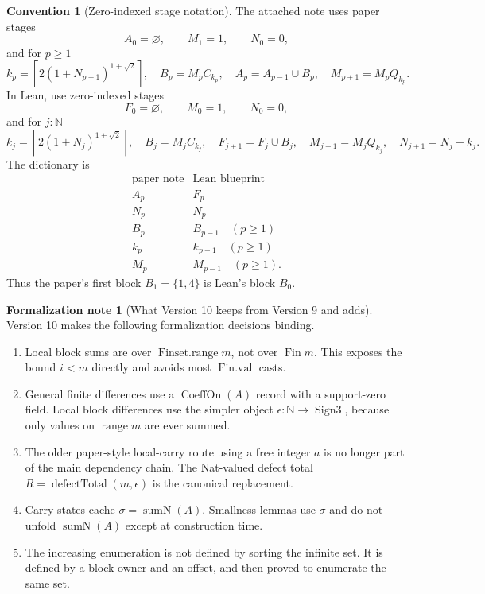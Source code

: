 \documentclass[11pt]{article}
\theoremstyle{definition}
\newtheorem{convention}[definition]{Convention}
\newtheorem{formalnote}[definition]{Formalization note}
\theoremstyle{plain}
\theoremstyle{remark}
\newcommand{\N}{\mathbb{N}}
\newcommand{\SumN}{\operatorname{sumN}}
\newcommand{\CoeffOn}{\operatorname{CoeffOn}}
\newcommand{\DTotal}{\operatorname{defectTotal}}
\begin{document}
\begin{convention}[Zero-indexed stage notation]
The attached note uses paper stages
\[
        A_0=\varnothing,
        \qquad M_1=1,
        \qquad N_0=0,
\]
and for \(p\ge1\)
\[
        k_p=\left\lceil 2(1+N_{p-1})^{1+\sqrt2}\right\rceil,
        \quad B_p=M_pC_{k_p},
        \quad A_p=A_{p-1}\cup B_p,
        \quad M_{p+1}=M_pQ_{k_p}.
\]
In Lean, use zero-indexed stages
\[
        F_0=\varnothing,
        \qquad M_0=1,
        \qquad N_0=0,
\]
and for \(j:\N\)
\[
        k_j=\left\lceil 2(1+N_j)^{1+\sqrt2}\right\rceil,
        \quad B_j=M_jC_{k_j},
        \quad F_{j+1}=F_j\cup B_j,
        \quad M_{j+1}=M_jQ_{k_j},
        \quad N_{j+1}=N_j+k_j.
\]
The dictionary is
\[
\begin{array}{c|c}
\text{paper note} & \text{Lean blueprint}\\ \hline
A_p & F_p\\
N_p & N_p\\
B_p & B_{p-1}\quad(p\ge1)\\
k_p & k_{p-1}\quad(p\ge1)\\
M_p & M_{p-1}\quad(p\ge1).
\end{array}
\]
Thus the paper's first block \(B_1=\{1,4\}\) is Lean's block \(B_0\).
\end{convention}

\begin{formalnote}[What Version 10 keeps from Version 9 and adds]
Version 10 makes the following formalization decisions binding.
\begin{enumerate}[label=(\arabic*), leftmargin=*]
\item Local block sums are over \(\operatorname{Finset.range} m\), not over \(\operatorname{Fin} m\).  This exposes the bound \(i<m\) directly and avoids most \(\operatorname{Fin.val}\) casts.
\item General finite differences use a \(\CoeffOn(A)\) record with a support-zero field.  Local block differences use the simpler object \(\epsilon:\N\to\operatorname{Sign3}\), because only values on \(\operatorname{range} m\) are ever summed.
\item The older paper-style local-carry route using a free integer \(a\) is no longer part of the main dependency chain.  The Nat-valued defect total \(R=\DTotal(m,\epsilon)\) is the canonical replacement.
\item Carry states cache \(\sigma=\SumN(A)\).  Smallness lemmas use \(\sigma\) and do not unfold \(\SumN(A)\) except at construction time.
\item The increasing enumeration is not defined by sorting the infinite set.  It is defined by a block owner and an offset, and then proved to enumerate the same set.
\end{enumerate}
\end{formalnote}
\end{document}
